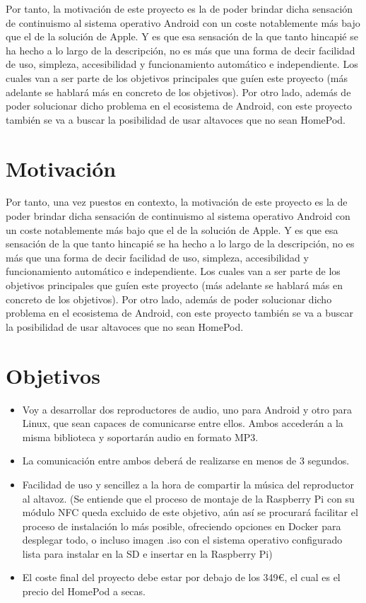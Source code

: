 Por tanto, la motivación de este proyecto es la de poder brindar dicha sensación de continuismo al sistema operativo Android con un coste notablemente más bajo que el de la solución de Apple. Y es que esa sensación de la que tanto hincapié se ha hecho a lo largo de la descripción, no es más que una forma de decir facilidad de uso, simpleza, accesibilidad y funcionamiento automático e independiente. Los cuales van a ser parte de los objetivos principales que guíen este proyecto (más adelante se hablará más en concreto de los objetivos). Por otro lado, además de poder solucionar dicho problema en el ecosistema de Android, con este proyecto también se va a buscar la posibilidad de usar altavoces que no sean HomePod.


\section{Motivación}
Por tanto, una vez puestos en contexto, la motivación de este proyecto es la de poder brindar dicha sensación de continuismo al sistema operativo Android con un coste notablemente más bajo que el de la solución de Apple. Y es que esa sensación de la que tanto hincapié se ha hecho a lo largo de la descripción, no es más que una forma de decir facilidad de uso, simpleza, accesibilidad y funcionamiento automático e independiente. Los cuales van a ser parte de los objetivos principales que guíen este proyecto (más adelante se hablará más en concreto de los objetivos). Por otro lado, además de poder solucionar dicho problema en el ecosistema de Android, con este proyecto también se va a buscar la posibilidad de usar altavoces que no sean HomePod. 

\section{Objetivos}
\begin{itemize}
    \item Voy a desarrollar dos reproductores de audio, uno para Android y otro para Linux, que sean capaces de comunicarse entre ellos. Ambos accederán a la misma biblioteca y soportarán audio en formato MP3.
    \item La comunicación entre ambos deberá de realizarse en menos de 3 segundos.
    \item Facilidad de uso y sencillez a la hora de compartir la música del reproductor al altavoz. (Se entiende que el proceso de montaje de la Raspberry Pi con su módulo NFC queda excluido de este objetivo, aún así se procurará facilitar el proceso de instalación lo más posible, ofreciendo opciones en Docker para desplegar todo, o incluso imagen .iso con el sistema operativo configurado lista para instalar en la SD e insertar en la Raspberry Pi)
    \item El coste final del proyecto debe estar por debajo de los 349€, el cual es el precio del HomePod a secas.
\end{itemize}